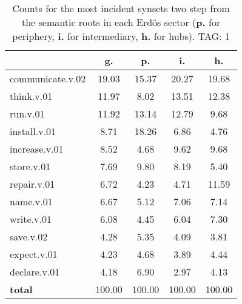 \begin{table}[h!]
\begin{center}
\begin{tabular}{| l | c | c | c | c |}\hline
 & g. & p. & i. & h. \\\hline
communicate.v.02 & 19.03  & 15.37  & 20.27  & 19.68 \\\hline
think.v.01 & 11.97  & 8.02  & 13.51  & 12.38 \\\hline
run.v.01 & 11.92  & 13.14  & 12.79  & 9.68 \\\hline
install.v.01 & 8.71  & 18.26  & 6.86  & 4.76 \\\hline
increase.v.01 & 8.52  & 4.68  & 9.62  & 9.68 \\\hline
store.v.01 & 7.69  & 9.80  & 8.19  & 5.40 \\\hline
repair.v.01 & 6.72  & 4.23  & 4.71  & 11.59 \\\hline
name.v.01 & 6.67  & 5.12  & 7.06  & 7.14 \\\hline
write.v.01 & 6.08  & 4.45  & 6.04  & 7.30 \\\hline
save.v.02 & 4.28  & 5.35  & 4.09  & 3.81 \\\hline
expect.v.01 & 4.23  & 4.68  & 3.89  & 4.44 \\\hline
declare.v.01 & 4.18  & 6.90  & 2.97  & 4.13 \\\hline
{{\bf total}} & 100.00  & 100.00  & 100.00  & 100.00 \\\hline
\end{tabular}
\caption{Counts for the most incident synsets two step from the semantic roots in each Erd\"os sector ({\bf p.} for periphery, {\bf i.} for intermediary, {\bf h.} for hubs). TAG: 1}
\end{center}
\end{table}